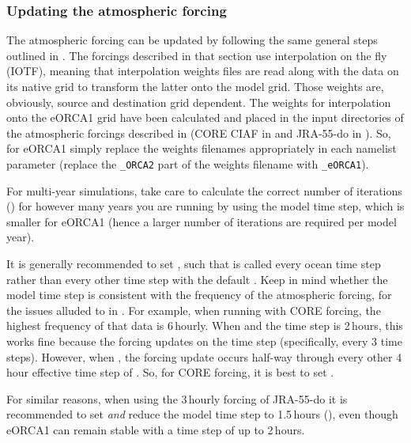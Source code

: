 \subsubsection{Updating the atmospheric forcing}
\label{sec:grids-eorca1-atmospheric}

The atmospheric forcing can be updated by following the same general steps outlined in .
The forcings described in that section use interpolation on the fly (IOTF), meaning that interpolation weights files are read along with the data on its native grid to transform the latter onto the model grid.
Those weights are, obviously, source and destination grid dependent.
The weights for interpolation onto the eORCA1 grid have been calculated and placed in the input directories of the atmospheric forcings described in  (CORE CIAF in  and \mbox{JRA-55-do} in ).
So, for eORCA1 simply replace the weights filenames appropriately in each  namelist parameter (replace the \texttt{_ORCA2} part of the weights filename with \texttt{_eORCA1}).

For multi-year simulations, take care to calculate the correct number of iterations () for however many years you are running by using the model time step, which is smaller for eORCA1 (hence a larger number of iterations are required per model year).

It is generally recommended to set , such that \SIcu{} is called every ocean time step rather than every other time step with the default .
Keep in mind whether the model time step is consistent with the frequency of the atmospheric forcing, for the issues alluded to in .
For example, when running with CORE forcing, the highest frequency of that data is 6\,hourly.
When  and the time step is 2\,hours, this works fine because the forcing updates on the time step (specifically, every 3 time steps).
However, when , the forcing update occurs half-way through every other 4\,hour effective time step of \SIcu{}.
So, for CORE forcing, it is best to set .

For similar reasons, when using the 3\,hourly forcing of JRA-55-do it is recommended to set  \textit{and} reduce the model time step to 1.5\,hours (), even though eORCA1 can remain stable with a time step of up to 2\,hours.


